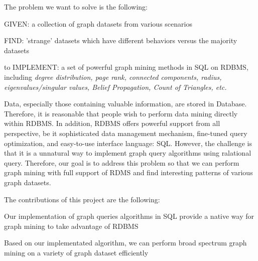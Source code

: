 
The problem we want to solve is the following:
\bit
\item GIVEN: a collection of graph datasets from various scenarios
\item FIND: 'strange' datasets which have different behaviors versus the majority datasets
\item to IMPLEMENT: a set of powerful graph mining methods in SQL on RDBMS, including {\em degree distribution, page rank, connected components, radius, eigenvalues/singular values, Belief Propagation, Count of Triangles, etc.}
\eit

Data, especially those containing valuable information, are stored in Database. Therefore, it is reasonable that people wish to perform data mining directly within RDBMS. In addition, RDBMS offers powerful support from all perspective, be it sophisticated data management mechanism, fine-tuned query optimization, and easy-to-use interface language: SQL. However, the challenge is that it is a unnatural way to implement graph query algorithms using ralational query. Therefore, our goal is to address this problem so that we can perform graph mining with full support of RDMS and find interesting patterns of various graph datasets. 

The contributions of this project are the following:
\bit
\item Our implementation of graph queries algorithms in SQL provide a native way for graph mining to take advantage of RDBMS
\item Based on our implementated algorithm, we can perform broad spectrum graph mining on a variety of graph dataset efficiently
\eit
